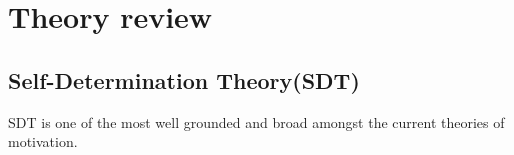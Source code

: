 \section{Theory review}

\subsection{Self-Determination Theory(SDT)}

SDT is one of the most well grounded and broad amongst the current theories of
motivation.\cite{motivation:handbook_self_determination} 

